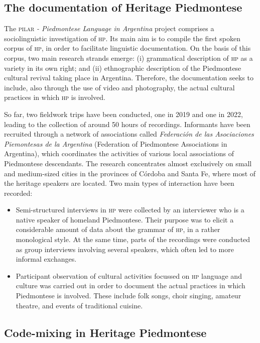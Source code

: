 \documentclass[output=paper]{langscibook}
\begin{document}
\subsection{The documentation of Heritage Piedmontese}

The \textsc{pilar} \textit{- Piedmontese Language in Argentina} project comprises a sociolinguistic investigation of \textsc{hp}. Its main aim is to compile the first spoken corpus of \textsc{hp}, in order to facilitate linguistic documentation. On the basis of this corpus, two main research strands emerge: (i) grammatical description of \textsc{hp} as a variety in its own right; and (ii) ethnographic description of the Piedmontese cultural revival taking place in Argentina. Therefore, the documentation seeks to include, also through the use of video and photography, the actual cultural practices in which \textsc{hp} is involved.

So far, two fieldwork trips have been conducted, one in 2019 and one in 2022, leading to the collection of around 50 hours of recordings. Informants have been recruited through a network of associations called \textit{Federación de las Asociaciones Piemontesas de la Argentina} (Federation of Piedmontese Associations in Argentina), which coordinates the activities of various local associations of Piedmontese descendants. The research concentrates almost exclusively on small and medium-sized cities in the provinces of Córdoba and Santa Fe, where most of the heritage speakers are located. Two main types of interaction have been recorded:

\begin{itemize}
\item Semi-structured interviews in \textsc{hp} were collected by an interviewer who is a native speaker of homeland Piedmontese. Their purpose was to elicit a considerable amount of data about the grammar of \textsc{hp}, in a rather monological style. At the same time, parts of the recordings were conducted as group interviews involving several speakers, which often led to more informal exchanges.
\item Participant observation of cultural activities focussed on \textsc{hp} language and culture was carried out in order to document the actual practices in which Piedmontese is involved. These include folk songs, choir singing, amateur theatre, and events of traditional cuisine.
\end{itemize}
\subsection{Code-mixing in Heritage Piedmontese}
\end{document}
